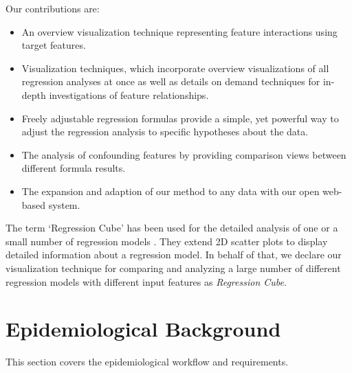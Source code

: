 \documentclass[journal]{style/vgtc} 			          %
\begin{document}
Our contributions are:
\begin{itemize}
	\item An overview visualization technique representing feature interactions using target features.
	\item Visualization techniques, which incorporate overview visualizations of all regression analyses at once as well as details on demand techniques for in-depth investigations of feature relationships.
	\item Freely adjustable regression formulas provide a simple, yet powerful way to adjust the regression analysis to specific hypotheses about the data.
	\item The analysis of confounding features by providing comparison views between different formula results.
	\item The expansion and adaption of our method to any data with our open web-based system.
\end{itemize}
The term `Regression Cube' has been used for the detailed analysis of one or a small number of regression models \cite{Ahmadi, Chan}.
They extend 2D scatter plots to display detailed information about a regression model.
In behalf of that, we declare our visualization technique for comparing and analyzing a large number of different regression models with different input features as \emph{Regression Cube}.
\section{Epidemiological Background} \label{sec:Background}
This section covers the epidemiological workflow and requirements.
\end{document}
